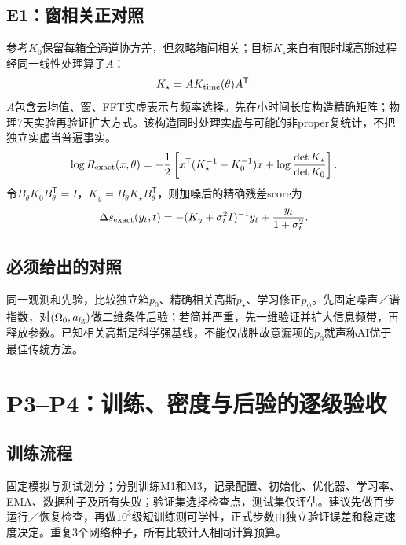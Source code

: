 \documentclass[UTF8,fontset=none,a4paper,11pt]{ctexart}
\begin{document}
\subsection{E1：窗相关正对照}
参考$K_0$保留每箱全通道协方差，但忽略箱间相关；目标$K_\star$来自有限时域高斯过程经同一线性处理算子$A$：
\[
K_\star=A K_{\rm time}(\theta)A^{\mathsf T}.
\]
$A$包含去均值、窗、FFT实虚表示与频率选择。先在小时间长度构造精确矩阵；物理7天实验再验证扩大方式。该构造同时处理实虚与可能的非proper复统计，不把独立实虚当普遍事实。
\[
\log R_{\rm exact}(x,\theta)=-\frac12\left[
 x^{\mathsf T}(K_\star^{-1}-K_0^{-1})x
 +\log\frac{\det K_\star}{\det K_0}\right].
\]
令$B_\theta K_0B_\theta^{\mathsf T}=I$，$K_y=B_\theta K_\star B_\theta^{\mathsf T}$，则加噪后的精确残差score为
\[
\Delta s_{\rm exact}(y_t,t)=-(K_y+\sigma_t^2I)^{-1}y_t
 +\frac{y_t}{1+\sigma_t^2}.
\]
\subsection{必须给出的对照}
同一观测和先验，比较独立箱$p_0$、精确相关高斯$p_\star$、学习修正$p_\phi$。先固定噪声／谱指数，对$(\Omega_0,a_{\rm fg})$做二维条件后验；若简并严重，先一维验证并扩大信息频带，再释放参数。已知相关高斯是科学强基线，不能仅战胜故意漏项的$p_0$就声称AI优于最佳传统方法。
\clearpage

\section{P3--P4：训练、密度与后验的逐级验收}
\subsection{训练流程}
固定模拟与测试划分；分别训练M1和M3，记录配置、初始化、优化器、学习率、EMA、数据种子及所有失败；验证集选择检查点，测试集仅评估。建议先做百步运行／恢复检查，再做$10^3$级短训练测可学性，正式步数由独立验证误差和稳定速度决定。重复3个网络种子，所有比较计入相同计算预算。
\end{document}
